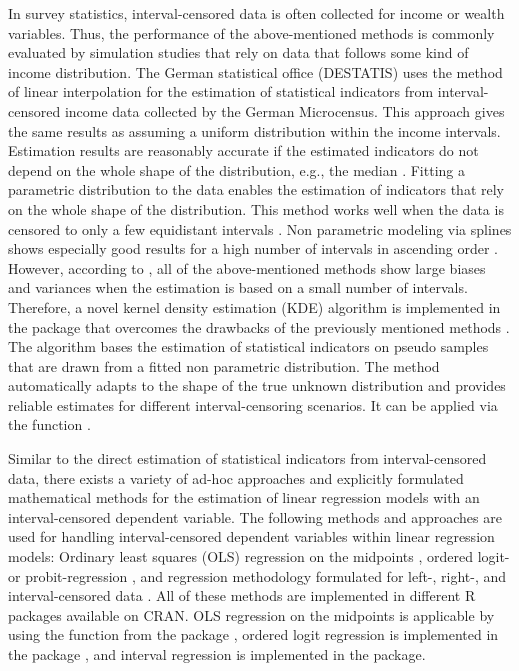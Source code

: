 In survey statistics, interval-censored data is often collected for income or wealth variables. Thus, the performance of the above-mentioned methods is commonly evaluated by simulation studies that rely on data that follows some kind of income distribution. The German statistical office (DESTATIS) uses the method of linear interpolation for the estimation of statistical indicators from interval-censored income data collected by the German Microcensus. This approach gives the same results as assuming a uniform distribution within the income intervals. Estimation results are reasonably accurate if the estimated indicators do not depend on the whole shape of the distribution, e.g., the median \citep{Len16}. Fitting a parametric distribution to the data enables the estimation of indicators that rely on the whole shape of the distribution. This method works well when the data is censored to only a few equidistant intervals \citep{Len16}. Non parametric modeling via splines shows especially good results for a high number of intervals in ascending order \citep{Len16}.  However, according to \citet{Len16}, all of the above-mentioned methods show large biases and variances when the estimation is based on a small number of intervals. Therefore, a novel kernel density estimation (KDE) algorithm is implemented in the  package that overcomes the drawbacks of the previously mentioned methods \citep{Wal19, Wal20}. The algorithm bases the estimation of statistical indicators on pseudo samples that are drawn from a fitted non parametric distribution. The method automatically adapts to the shape of the true unknown distribution and provides reliable estimates for different interval-censoring scenarios. It can be applied via the function .


Similar to the direct estimation of statistical indicators from interval-censored data, there exists a variety of ad-hoc approaches and explicitly formulated mathematical methods for the estimation of linear regression models with an interval-censored dependent variable. The following methods and approaches are used for handling interval-censored dependent variables within linear regression models: Ordinary least squares (OLS) regression on the midpoints \citep{Tho03}, ordered logit- or probit-regression \citep{McC80}, and regression methodology formulated for left-, right-,  and interval-censored data \citep{Tob58, Ros75, Ste83}. All of these methods are implemented in different R packages available on CRAN. OLS regression on the midpoints is applicable by using the  function from the  package \citep{Cor20}, ordered logit regression is implemented in the  package \citep{Rip19, Ven02}, and interval regression is implemented in the  \citep{Ter20, Ter00} package.



